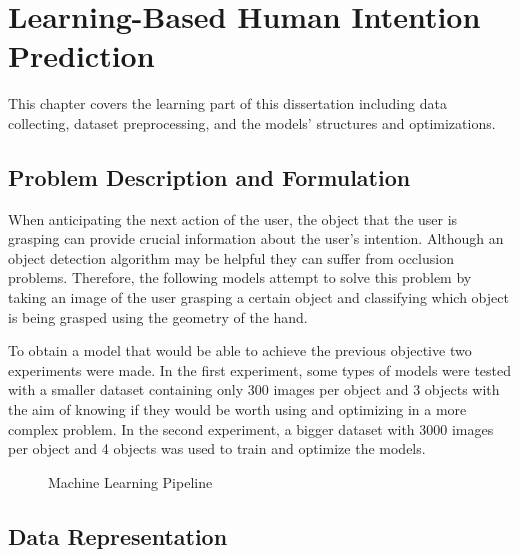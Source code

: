 \chapter{Learning-Based Human Intention Prediction}
\label{chapter:learning}


This chapter covers the learning part of this dissertation including data collecting, dataset preprocessing, and the models' structures and optimizations.

\section{Problem Description and Formulation}

When anticipating the next action of the user, the object that the user is grasping can provide crucial information about the user's intention. Although an object detection algorithm may be helpful they can suffer from occlusion problems. Therefore, the following models attempt to solve this problem by taking an image of the user grasping a certain object and classifying which object is being grasped using the geometry of the hand.

To obtain a model that would be able to achieve the previous objective two experiments were made. In the first experiment, some types of models were tested with a smaller dataset containing only 300 images per object and 3 objects with the aim of knowing if they would be worth using and optimizing in a more complex problem. In the second experiment, a bigger dataset with 3000 images per object and 4 objects was used to train and optimize the models.

\begin{figure}[H]%
    \centering
    
    \caption{Machine Learning Pipeline}
    \label{fig:ml_pipeline}
\end{figure}

\section{Data Representation}


